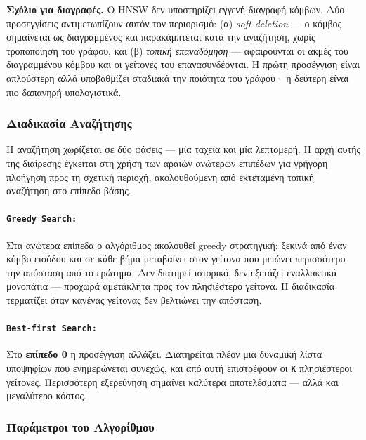 \documentclass[12pt,a4paper]{article}
\begin{document}
\textbf{Σχόλιο για διαγραφές.} Ο HNSW δεν υποστηρίζει εγγενή διαγραφή κόμβων. Δύο προσεγγίσεις αντιμετωπίζουν αυτόν τον περιορισμό: (α) \textit{soft deletion} — ο κόμβος σημαίνεται ως διαγραμμένος και παρακάμπτεται κατά την αναζήτηση, χωρίς τροποποίηση του γράφου, και (β) \textit{τοπική επαναδόμηση} — αφαιρούνται οι ακμές του διαγραμμένου κόμβου και οι γείτονές του επανασυνδέονται. Η πρώτη προσέγγιση είναι απλούστερη αλλά υποβαθμίζει σταδιακά την ποιότητα του γράφου· η δεύτερη είναι πιο δαπανηρή υπολογιστικά.

\subsubsection{Διαδικασία Αναζήτησης}
Η αναζήτηση χωρίζεται σε δύο φάσεις --- μία ταχεία και μία λεπτομερή. Η αρχή αυτής της διαίρεσης έγκειται στη χρήση των αραιών ανώτερων επιπέδων για γρήγορη πλοήγηση προς τη σχετική περιοχή, ακολουθούμενη από εκτεταμένη τοπική αναζήτηση στο επίπεδο βάσης.

\paragraph{\texttt{Greedy Search:}}
Στα ανώτερα επίπεδα ο αλγόριθμος ακολουθεί greedy στρατηγική: ξεκινά από έναν κόμβο εισόδου και σε κάθε βήμα μεταβαίνει στον γείτονα που μειώνει περισσότερο την απόσταση από το ερώτημα. Δεν διατηρεί ιστορικό, δεν εξετάζει εναλλακτικά μονοπάτια --- προχωρά αμετάκλητα προς τον πλησιέστερο γείτονα. Η διαδικασία τερματίζει όταν κανένας γείτονας δεν βελτιώνει την απόσταση.

\paragraph{\texttt{Best-first Search:}}
Στο \textbf{επίπεδο 0} η προσέγγιση αλλάζει. Διατηρείται πλέον μια δυναμική λίστα υποψηφίων που ενημερώνεται συνεχώς, και από αυτή επιστρέφουν οι \textbf{\texttt{K}} πλησιέστεροι γείτονες. Περισσότερη εξερεύνηση σημαίνει καλύτερα αποτελέσματα --- αλλά και μεγαλύτερο κόστος.



\subsubsection{Παράμετροι του Αλγορίθμου}
\end{document}
